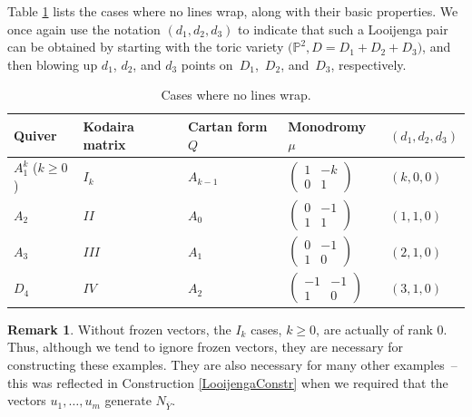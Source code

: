 \documentclass[11pt]{article}
\numberwithin{equation}{section}
\numberwithin{figure}{section}
\numberwithin{table}{section}
\let\?=\overline
\let\bb=\mathbb
\theoremstyle{definition}
\newtheorem{rmk}[thm]{Remark}
\begin{document}
Table \ref{tab:no wrap} lists the cases where no lines wrap, along with their basic properties. We once again use the notation $(d_1,d_2,d_3)$ to indicate that such a Looijenga pair can be obtained by starting with the toric variety $\big(\bb{P}^2,D=D_1+D_2+D_3\big)$, and then blowing up $d_1$, $d_2$, and $d_3$ points on~$D_1$,~$D_2$, and~$D_3$, respectively.
\begin{table}[h]\centering
 \begin{tabular}{ | l | l | l | l | l|}
 \hline
 Quiver & Kodaira matrix & Cartan form $Q$ & Monodromy $\mu$ & $(d_1,d_2,d_3)$ \\ \hline
 $A_1^k$ ($k\geq 0$) & $I_{k}$ & $A_{k-1}$ & 	 $\left(\begin{matrix}
		1 &-k \\
	 0 &1
		\end{matrix}\right)$				 		& $(k,0,0)$ \\ \hline
 $A_2$ & $II$ & $A_0$ & 		$\left(\begin{matrix}
		0 &-1 \\
	 1 &1
		\end{matrix}\right)$		& $(1,1,0)$	 \\ \hline
 $A_3$ & $III$ &$A_1$ &	$\left(\begin{matrix}
		0 &-1 \\
	 1 &0
		\end{matrix}\right)$	 	 & $(2,1,0)$	 \\ \hline
 $D_4$ & $IV$ &$A_2$ & 	$\left(\begin{matrix}
		-1 &-1 \\
	 1 &0
		\end{matrix}\right)$			& $(3,1,0)$			 \\ \hline
 \end{tabular}
 \caption{Cases where no lines wrap.}\label{tab:no wrap}
\end{table}

\begin{rmk}\label{NeedFrozen}
Without frozen vectors, the $I_k$ cases, $k\geq 0$, are actually of rank $0$. Thus, although we tend to ignore frozen vectors, they are necessary for constructing these examples. They are also necessary for many other examples~-- this was reflected in Construction \ref{LooijengaConstr} when we required that the vectors $u_1,\dots,u_m$ generate $N_{\?{Y}}$.
\end{rmk}
\end{document}
